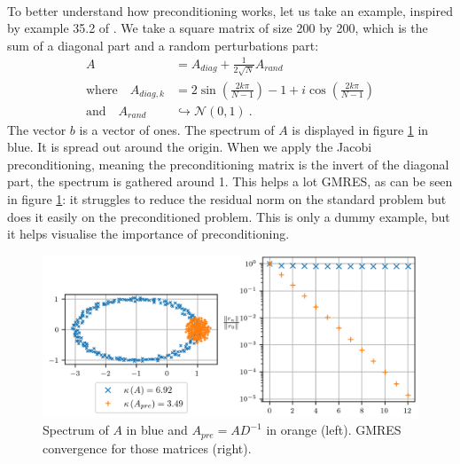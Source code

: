       \paragraph{}
       To better understand how preconditioning works, let us take an example, inspired by example 35.2 of \cite{TrefethenBau1997}.
       We take a square matrix of size 200 by 200, which is the sum of a diagonal part and a random perturbations part:
       \begin{equation}
         \begin{aligned}
           A &= A_{diag} + \frac{1}{2\sqrt{N}}A_{rand} \\
           \textrm{where}\quad A_{diag, k} &= 2\sin\left( \frac{2 k \pi}{N - 1} \right) - 1 + i \cos\left( \frac{2 k \pi}{N - 1} \right) \\
           \textrm{and}\quad A_{rand} &\hookrightarrow \mathcal{N}\left(0, 1\right) \ .
         \end{aligned}
       \end{equation}
       The vector $b$ is a vector of ones.
       The spectrum of $A$ is displayed in figure \ref{fig:preconditioning} in blue.
       It is spread out around the origin.
       When we apply the Jacobi preconditioning, meaning the preconditioning matrix is the invert of the diagonal part, the spectrum is gathered around 1.
       This helps a lot GMRES, as can be seen in figure \ref{fig:preconditioning}: it struggles to reduce the residual norm on the standard problem but does it easily on the preconditioned problem.
       This is only a dummy example, but it helps visualise the importance of preconditioning.

   		\begin{figure}
   			\centering
   			\includegraphics{figures/preconditioning.png}
   			\caption{Spectrum of $A$ in blue and $A_{pre} = AD^{-1}$ in orange (left). GMRES convergence for those matrices (right).}
   			\label{fig:preconditioning}
   		\end{figure}

